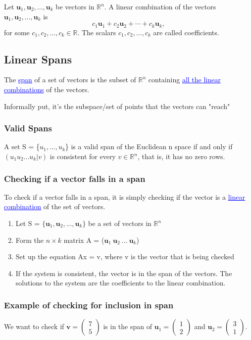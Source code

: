 \documentclass{article}
\newcommand{\bul}[1]{\textcolor{blue}{\underline{#1}}}
\newcommand{\sbreak}{\vspace{10pt}}
\begin{document}
Let \( \mathbf{u}_1, \mathbf{u}_2, \dots, \mathbf{u}_k \) be vectors in \( \mathbb{R}^n \). A linear combination of the vectors \( \mathbf{u}_1, \mathbf{u}_2, \dots, \mathbf{u}_k \) is
\[
c_1 \mathbf{u}_1 + c_2 \mathbf{u}_2 + \cdots + c_k \mathbf{u}_k,
\]
for some \( c_1, c_2, \dots, c_k \in \mathbb{R} \). The scalars \( c_1, c_2, \dots, c_k \) are called coefficients.

\subsection{Linear Spans}
The \bul{span} of a set of vectors is the subset of $\mathbb{R}^n$ containing \bul{all the linear combinations} of the vectors.

\sbreak

Informally put, it's the subspace/set of points that the vectors can "reach"

\subsubsection{Valid Spans}
A set S = \{$u_1, ..., u_k$\} is a valid span of the Euclidean n space if and only if $(u_1 u_2 ... u_k | v)$  is consistent for every $v \in \mathbb{R}^n$, that is, it has no zero rows.

\subsubsection{Checking if a vector falls in a span}
To check if a vector falls in a span, it is simply checking if the vector is a \bul{linear combination} of the set of vectors.

\sbreak


\begin{enumerate}
    \item Let S = $\{ \textbf{u}_1, \textbf{u}_2, ..., \textbf{u}_k \}$ be a set of vectors in $\mathbb{R}^n$
    \item Form the $n\times k$ matrix A = ($\textbf{u}_1\ \textbf{u}_2\ ...\ \textbf{u}_k$)
    \item Set up the equation Ax = v, where v is the vector that is being checked
    \item If the system is consistent, the vector is in the span of the vectors. The solutions to the system are the coefficients to the linear combination.
\end{enumerate}

\subsubsection{Example of checking for inclusion in span}
We want to check if \( \mathbf{v} = \begin{pmatrix} 7 \\ 5 \end{pmatrix} \) is in the span of \( \mathbf{u}_1 = \begin{pmatrix} 1 \\ 2 \end{pmatrix} \) and \( \mathbf{u}_2 = \begin{pmatrix} 3 \\ 1 \end{pmatrix} \).
\end{document}
